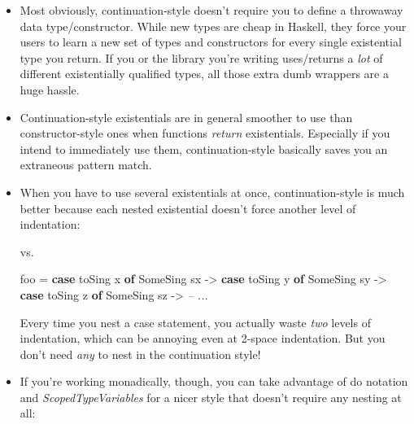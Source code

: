 \documentclass[]{article}
\newenvironment{Shaded}{\begin{snugshade}}{\end{snugshade}}
\newcommand{\CommentTok}[1]{\textcolor[rgb]{0.56,0.35,0.01}{\textit{#1}}}
\newcommand{\DataTypeTok}[1]{\textcolor[rgb]{0.13,0.29,0.53}{#1}}
\newcommand{\FunctionTok}[1]{\textcolor[rgb]{0.00,0.00,0.00}{#1}}
\newcommand{\KeywordTok}[1]{\textcolor[rgb]{0.13,0.29,0.53}{\textbf{#1}}}
\newcommand{\NormalTok}[1]{#1}
\newcommand{\OtherTok}[1]{\textcolor[rgb]{0.56,0.35,0.01}{#1}}
\begin{document}
\begin{itemize}
\item
  Most obviously, continuation-style doesn't require you to define a throwaway
  data type/constructor. While new types are cheap in Haskell, they force your
  users to learn a new set of types and constructors for every single
  existential type you return. If you or the library you're writing uses/returns
  a \emph{lot} of different existentially qualified types, all those extra dumb
  wrappers are a huge hassle.
\item
  Continuation-style existentials are in general smoother to use than
  constructor-style ones when functions \emph{return} existentials. Especially
  if you intend to immediately use them, continuation-style basically saves you
  an extraneous pattern match.
\item
  When you have to use several existentials at once, continuation-style is much
  better because each nested existential doesn't force another level of
  indentation:

\begin{Shaded}
\end{Shaded}

  vs.

\begin{Shaded}
\begin{Highlighting}[]
\NormalTok{foo }\FunctionTok{=} \KeywordTok{case}\NormalTok{ toSing x }\KeywordTok{of}
        \DataTypeTok{SomeSing}\NormalTok{ sx }\OtherTok{->}
          \KeywordTok{case}\NormalTok{ toSing y }\KeywordTok{of}
            \DataTypeTok{SomeSing}\NormalTok{ sy }\OtherTok{->}
              \KeywordTok{case}\NormalTok{ toSing z }\KeywordTok{of}
                \DataTypeTok{SomeSing}\NormalTok{ sz }\OtherTok{->}
                  \CommentTok{-- ...}
\end{Highlighting}
\end{Shaded}

  Every time you nest a case statement, you actually waste \emph{two} levels of
  indentation, which can be annoying even at 2-space indentation. But you don't
  need \emph{any} to nest in the continuation style!
\item
  If you're working monadically, though, you can take advantage of do notation
  and \emph{ScopedTypeVariables} for a nicer style that doesn't require any
  nesting at all:


\end{itemize}
\end{document}
